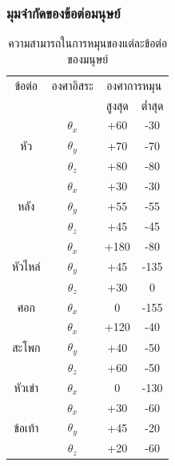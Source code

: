 \subsubsection{มุมจำกัดของข้อต่อมนุษย์}
\begin{table}[htbp]
	\centering
	\begin{tabular}{|c|c|c|c|}
		\hline
		{ข้อต่อ}&{องศาอิสระ}&\multicolumn{2}{c|}{องศาการหมุน}\\
		\cline{3-4}
		{}                                     & {}         & {สูงสุด} & {ต่ำสุด} \\
		\hline
		\multirow{3}{*}{หัว}             & $\theta_x$ & +60                  & -30                  \\
		\cline{3-4}
		                                       & $\theta_y$ & +70                  & -70                  \\
		\cline{3-4}
		                                       & $\theta_z$ & +80                  & -80                  \\
		\hline
		\multirow{3}{*}{หลัง}          & $\theta_x$ & +30                  & -30                  \\
		\cline{3-4}
		                                       & $\theta_y$ & +55                  & -55                  \\
		\cline{3-4}
		                                       & $\theta_z$ & +45                  & -45                  \\
		\hline
		\multirow{3}{*}{หัวไหล่} & $\theta_x$ & +180                 & -80                  \\
		\cline{3-4}
		                                       & $\theta_y$ & +45                  & -135                 \\
		\cline{3-4}
		                                       & $\theta_z$ & +30                  & 0                    \\
		\hline
		{ศอก}                            & $\theta_x$ & 0                    & -155                 \\
		\hline
		\multirow{3}{*}{สะโพก}       & $\theta_x$ & +120                 & -40                  \\
		\cline{3-4}
		                                       & $\theta_y$ & +40                  & -50                  \\
		\cline{3-4}
		                                       & $\theta_z$ & +60                  & -50                  \\
		\hline
        {หัวเข่า}                & $\theta_x$ & 0                    & -130                 \\
        \hline
		\multirow{3}{*}{ข้อเท้า} & $\theta_x$ & +30                  & -60                  \\
		\cline{3-4}
		                                       & $\theta_y$ & +45                  & -20                  \\
		\cline{3-4}
		                                       & $\theta_z$ & +20                  & -60                  \\
		\hline
	\end{tabular}
	\caption{ความสามารถในการหมุนของแต่ละข้อต่อของมนุษย์}
	\label{tab:human_joint_limit}
\end{table}


